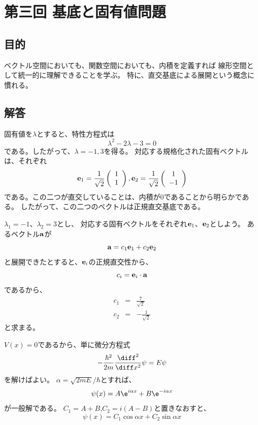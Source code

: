 \section{第三回 基底と固有値問題}

\subsection{目的}
ベクトル空間においても、関数空間においても、内積を定義すれば
線形空間として統一的に理解できることを学ぶ。
特に、直交基底による展開という概念に慣れる。

\subsection{解答}

固有値を$\lambda$とすると、特性方程式は
\begin{equation}
  \lambda^2 - 2 \lambda -3 = 0
\end{equation}
である。したがって、$\lambda = -1,3$を得る。
対応する規格化された固有ベクトルは、それぞれ
\begin{equation}
  {\bf e}_1 =
  \frac{1}{\sqrt{2}}
  \left(
  \begin{array}{c}
      1 \\ 1
    \end{array}
  \right)
  ,
  {\bf e}_2 =
  \frac{1}{\sqrt{2}}
  \left(
  \begin{array}{c}
      1 \\ -1
    \end{array}
  \right)
\end{equation}
である。この二つが直交していることは、内積が$0$であることから明らかである。
したがって、この二つのベクトルは正規直交基底である。

$\lambda_1 = -1$、$\lambda_2 = 3$とし、
対応する固有ベクトルをそれぞれ${\bf e}_1$、${\bf e}_2$としよう。
あるベクトル${\bf a}$が
$$
  {\bf a} = c_1 {\bf e}_1 +c_2 {\bf e}_2
$$
と展開できたとすると、${\bf e}_i$の正規直交性から、
$$
  c_i = {\bf e}_i \cdot {\bf a}
$$
であるから、
\begin{eqnarray}
  c_1 &=& \frac{7}{\sqrt{2}}\\
  c_2 &=& -\frac{1}{\sqrt{2}}
\end{eqnarray}
と求まる。

$V(x)=0$であるから、単に微分方程式
\begin{equation}
  -\frac{\hbar^2}{2m} \frac{\diff^2}{\diff x^2} \psi = E \psi
\end{equation}
を解けばよい。
$\alpha = \sqrt{2mE}/\hbar$とすれば、
\begin{equation}
  \psi(x) = A \e^{i \alpha x} + B \e^{- i \alpha x}
\end{equation}
が一般解である。
$C_1 = A+B$,$C_2 = i(A-B)$と置きなおすと、
\begin{equation}
  \psi(x) = C_1 \cos{\alpha x} + C_2 \sin{\alpha x}
\end{equation}



